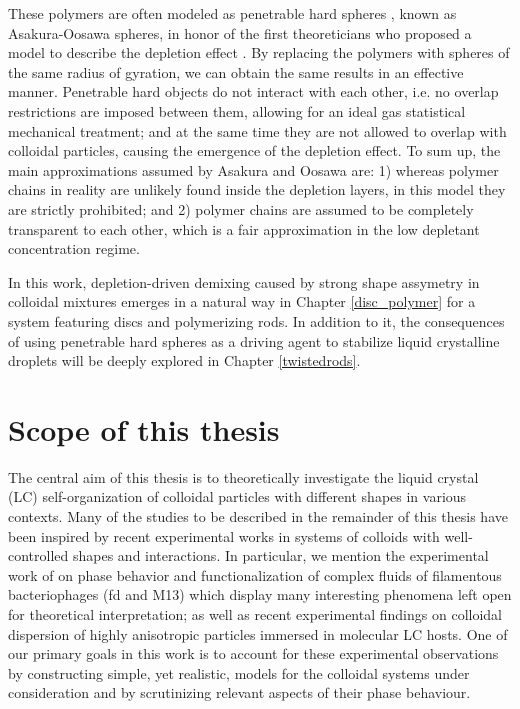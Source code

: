 These polymers are often modeled as penetrable hard spheres \cite{GARCIA201816}, known as Asakura-Oosawa spheres, in honor of the first theoreticians who proposed a model to describe the depletion effect \cite{ASAKURA54,ASAKURA58,Vrijdepletie}. By replacing the polymers with spheres of the same radius of gyration, we can obtain the same results in an effective manner. Penetrable hard objects do not interact with each other, i.e. no overlap restrictions are imposed between them, allowing for an ideal gas statistical mechanical treatment; and at the same time they are not allowed to overlap with colloidal particles, causing the emergence of the depletion effect. To sum up, the main approximations assumed by Asakura and Oosawa are: 1) whereas polymer chains in reality are unlikely found inside the depletion layers, in this model they are strictly prohibited; and 2) polymer chains are assumed to be completely transparent to each other, which is a fair approximation in the low depletant concentration regime.

In this work, depletion-driven demixing caused by strong shape assymetry in colloidal mixtures emerges in a natural way in Chapter \ref{disc_polymer} for a system featuring discs and polymerizing rods. In addition to it, the consequences of using penetrable hard spheres as a driving agent to stabilize liquid crystalline droplets will be deeply explored in Chapter \ref{twistedrods}.

\section{Scope of this thesis}

The central aim of this thesis is to theoretically investigate the liquid crystal (LC) self-organization of colloidal particles with different shapes in various contexts. Many of the studies to be described in the remainder of this thesis have been inspired by recent experimental works in systems of colloids with well-controlled shapes and interactions. In particular, we mention the experimental work of \cite{Grelet2014} on phase behavior and functionalization of complex fluids of filamentous bacteriophages (fd and M13) which display many interesting phenomena left open for theoretical interpretation; as well as recent experimental findings \cite{senyuk2021nematoelasticity,mundoor2021} on colloidal dispersion of highly anisotropic particles immersed in molecular LC hosts. One of our primary goals in this work is to account for these experimental observations by constructing simple, yet realistic,  models for the colloidal systems under consideration and by scrutinizing relevant aspects of their phase behaviour.


